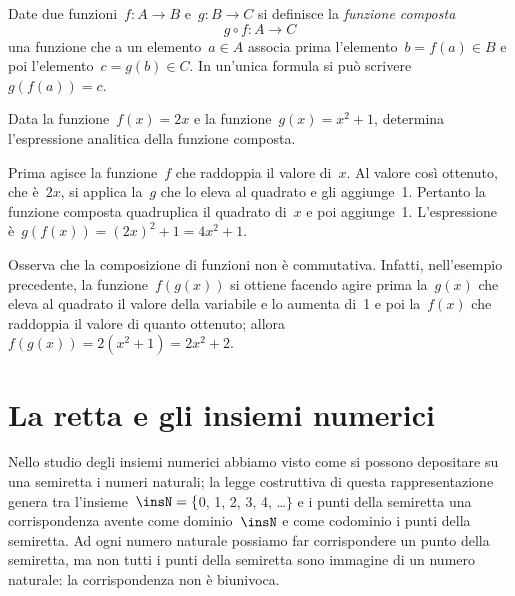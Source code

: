 \begin{definizione}
Date due funzioni~$f:A\rightarrow B$ e~$g:B\rightarrow C$ si
definisce la \emph{funzione composta}
\[g\circ f:A\rightarrow C\]
una funzione che a un elemento~$a \in A$ associa prima l'elemento~$b=f(a)\in B$ e
poi l'elemento~$c=g(b) \in C$. In un'unica
formula si può scrivere~$g(f(a))=c$.
\end{definizione}
\pagebreak
\begin{exrig}
 \begin{esempio}
 Data la funzione~$f(x)=2x$ e la funzione~$g(x)=x^2+1$, determina
l'espressione analitica della funzione composta.

Prima agisce la funzione~$f$ che raddoppia il valore di~$x$. Al valore
così ottenuto, che è~$2x$, si applica la~$g$ che lo eleva al quadrato
e gli aggiunge~1. Pertanto
la funzione composta quadruplica il quadrato di~$x$ e poi aggiunge~1.
L'espressione è~$g(f(x))=(2x)^2+1 = 4x^2+1$.
 \end{esempio}

\begin{center}
 
\end{center}

\end{exrig}

Osserva che la composizione di funzioni non è commutativa. Infatti, nell'esempio precedente, la
funzione~$f(g(x))$ si ottiene facendo agire prima la~$g(x)$ che eleva
al quadrato il valore della variabile e lo aumenta di~1
e poi la~$f(x)$ che raddoppia il valore di quanto ottenuto;
allora~$f(g(x))=2(x^2+1)=2x^2+2$.

\vspazio\ovalbox{\risolvii \ref{ese:8.13}, \ref{ese:8.14}, \ref{ese:8.15}, \ref{ese:8.16}}

\section{La retta e gli insiemi numerici}

Nello studio degli insiemi numerici abbiamo visto come si possono depositare su una semiretta i numeri naturali;
la legge costruttiva di questa rappresentazione genera tra l'insieme~$\insN=\{$0, 1, 2, 3, 4, \ldots$\}$ e i punti della
semiretta una corrispondenza avente come dominio~$\insN$ e come codominio i punti della semiretta.
Ad ogni numero naturale possiamo far corrispondere un punto della semiretta, ma non tutti i punti della semiretta
sono immagine di un numero naturale: la corrispondenza non è biunivoca.

